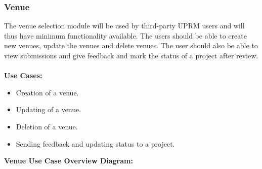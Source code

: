 \subsubsection{Venue}
	The venue selection module will be used by third-party UPRM users and will thus have minimum functionality available. The users should be able to create new venues, update the venues and delete venues. The user should also be able to view submissions and give feedback and mark the status of a project after review.\\ \\
	\textbf{Use Cases:}
	\begin{itemize}
		\item Creation of a venue.
		\item Updating of a venue.
		\item Deletion of a venue.
		\item Sending feedback and updating status to a project.\\
	\end{itemize}
	\textbf{Venue Use Case Overview Diagram:}\\
	\centerline{}	